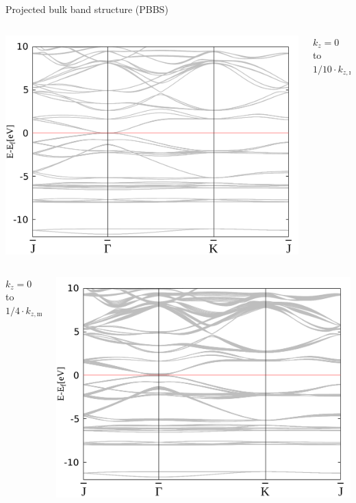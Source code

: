 \begin{frame}[fragile]{Projected bulk band structure (PBBS)}
\begin{columns}
\begin{column}{.33\linewidth}
			\centering
			\includegraphics[width=\linewidth]{andere_bilder/4_bulk_-12_10.pdf}
		\end{column}
		\begin{column}{.165\linewidth} \scriptsize{
			${k_z=0}$ to ${1/10\cdot k_{z,\text{max}}}$ }
		\end{column}
	\end{columns}
	\begin{columns}
		\begin{column}{.165\linewidth} \scriptsize{
				${k_z=0}$ to ${1/4\cdot k_{z,\text{max}}}$ }
		\end{column} \hspace{-.5cm}
		\begin{column}{.33\linewidth}
			\centering
			\includegraphics[width=\linewidth]{andere_bilder/10_bulk_-12_10.pdf}

\end{column}
\end{columns}
\end{frame}

